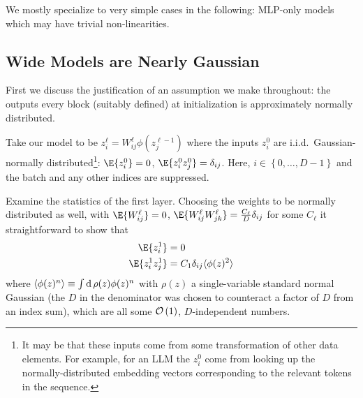 We mostly specialize to very simple cases in the following: MLP-only models which may have trivial
non-linearities.


\subsection{Wide Models are Nearly Gaussian \label{app_nearly_gaussian_wide_models}}

First we discuss the justification of an assumption we make throughout: the outputs every block
(suitably defined) at initialization is approximately normally distributed.

Take our model to be $ z ^{ \ell } _{ i } = W ^{  \ell }_{ ij } \phi \left ( z ^{ \ell -1 } _{ j }
\right ) $ where the inputs $ z ^{ 0 } _{ i } $ are i.i.d.~Gaussian-normally
distributed\footnote{It may be that these inputs come from some transformation of other data
    elements. For example, for an LLM the $ z ^{ 0 }_{ i } $ come from looking up the
    normally-distributed embedding vectors corresponding to the relevant tokens in the
sequence.}: $ \E{ z^{ 0 }_{ i }} = 0 $,  $ \E{ z ^{ 0 }_{ i }z ^{ 0 }_{ j }}
=  \delta _{ ij } $. Here, $ i \in \left \{ 0, \ldots , D-1 \right \} $ and the batch and any
other indices are suppressed.

Examine the statistics of the first layer. Choosing the weights to be normally distributed as well,
with $ \E{ W^{ \ell }_{ ij }} = 0 $,  $ \E{ W ^{ \ell }_{ ij }W ^{ \ell }_{ jk
}} = \frac{ C _{ \ell } }{ D } \delta _{ ij }$ for some $ C _{  \ell } $ it straightforward to
show that
\begin{align}
    \E{ z^{ 1 }_{ i }} &= 0 \nn
    \E{ z^{ 1 }_{ i }z^{ 1 }_{ j }} &= C _{ 1 }\delta _{ ij } \langle \phi(z )^{ 2 }\rangle
\end{align}
where  $ \langle \phi(z)^{ n }\rangle \equiv  \int  {\rm d}\, \rho(z) \phi(z)^{ n } $ with
$ \rho(z) $ a single-variable standard normal Gaussian (the $ D $ in the denominator was chosen to
counteract a factor of $ D $ from an index sum), which are all some $ \mathcal{O} \left( 1 \right)  $, $ D
$-independent numbers.

